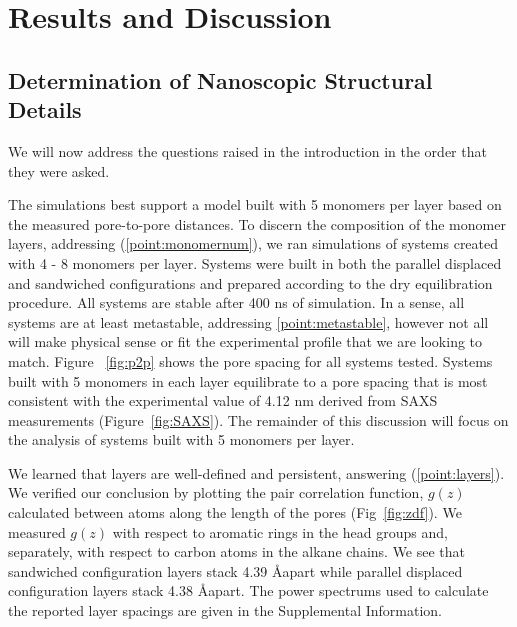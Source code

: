 \documentclass{article}
\newcommand{\angstrom}{\textup{\AA}}
\begin{document}
  \section*{Results and Discussion}
  
  \subsection*{Determination of Nanoscopic Structural Details}
  
  We will now address the questions raised in the introduction in the order
  that they were asked.  %

  The simulations best support a model built with 5 monomers per layer based on
  the measured pore-to-pore distances. To discern the composition of the
  monomer layers, addressing (\ref{point:monomernum}), we ran simulations of
  systems created with 4 - 8 monomers per layer. Systems were built in both the
  parallel displaced and sandwiched configurations and prepared according to the
  dry equilibration procedure. All systems are stable after 400 ns of simulation.
  In a sense, all systems are at least metastable, addressing
  \ref{point:metastable}, however not all will make physical sense or fit the
  experimental profile that we are looking to match. Figure ~\ref{fig:p2p}
  shows the pore spacing for all systems tested. Systems built with 5 monomers in
  each layer equilibrate to a pore spacing that is most consistent with the
  experimental value of 4.12 nm derived from SAXS measurements
  (Figure~\ref{fig:SAXS}). The remainder of this discussion will focus on the
  analysis of systems built with 5 monomers per layer.

  We learned that layers are well-defined and persistent, answering
  (\ref{point:layers}). We verified our conclusion by plotting the pair
  correlation function, $g(z)$ calculated between atoms along the length of the
  pores (Fig~\ref{fig:zdf}). We measured $g(z)$ with respect to aromatic rings in
  the head groups and, separately, with respect to carbon atoms in the alkane
  chains. We see that sandwiched configuration layers stack 4.39 \angstrom apart
  while parallel displaced configuration layers stack 4.38 \angstrom apart.  The
  power spectrums used to calculate the reported layer spacings are given in the
  Supplemental Information.
\end{document}
